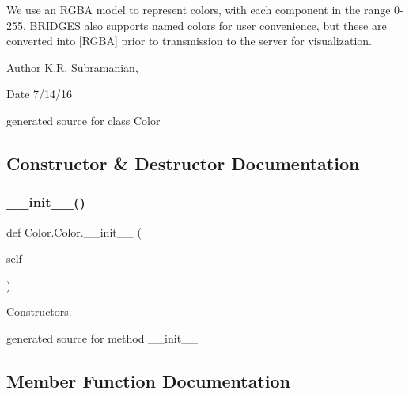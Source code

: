 We use an R\+G\+BA model to represent colors, with each component in the range 0-\/255. B\+R\+I\+D\+G\+ES also supports named colors for user convenience, but these are converted into \mbox{[}R\+G\+BA\mbox{]} prior to transmission to the server for visualization.

\begin{DoxyAuthor}{Author}
K.\+R. Subramanian, 
\end{DoxyAuthor}
\begin{DoxyDate}{Date}
7/14/16\begin{DoxyVerb}generated source for class Color \end{DoxyVerb}
 
\end{DoxyDate}


\subsection{Constructor \& Destructor Documentation}
\hypertarget{class_color_1_1_color_a54e49ab0562f1754ee309481f889734b}{}\label{class_color_1_1_color_a54e49ab0562f1754ee309481f889734b} 
\subsubsection{\texorpdfstring{\+\_\+\+\_\+init\+\_\+\+\_\+()}{\_\_init\_\_()}}
{\footnotesize\ttfamily def Color.\+Color.\+\_\+\+\_\+init\+\_\+\+\_\+ (\begin{DoxyParamCaption}\item[{}]{self }\end{DoxyParamCaption})}



Constructors. 

\begin{DoxyVerb}generated source for method __init__ \end{DoxyVerb}
 

\subsection{Member Function Documentation}
\hypertarget{class_color_1_1_color_a2d8eedef0a8731d96e2a1f802d04b42e}{}\label{class_color_1_1_color_a2d8eedef0a8731d96e2a1f802d04b42e} 

